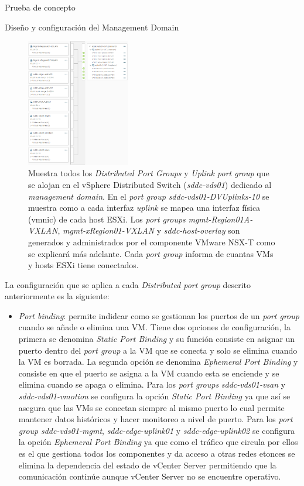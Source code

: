 \begin{section}{Prueba de concepto}
\begin{subsection}{Diseño y configuración del Management Domain}
\begin{itemize}
    \end{itemize}
    \begin{figure}[h]
      \centering
      \includegraphics[width=0.4\textwidth]{imaxes/pruebaconcepto/distributedSwitchEntornoFinal.png}
      \caption{Muestra todos los \textit{Distributed Port Groups} y \textit{Uplink port group} que se alojan en el vSphere Distributed Switch (\textit{sddc-vds01}) dedicado al \textit{management domain}. En el \textit{port group} \textit{sddc-vds01-DVUplinks-10} se muestra como a cada interfaz \textit{uplink} se mapea una interfaz física (vmnic) de cada host ESXi. Los \textit{port groups} \textit{mgmt-Region01A-VXLAN}, \textit{mgmt-xRegion01-VXLAN} y \textit{sddc-host-overlay} son generados y administrados por el componente VMware NSX-T como se explicará más adelante. Cada \textit{port group} informa de cuantas VMs y hosts ESXi tiene conectados.}
      \label{fig:port-groups-vSwitch-vSphere}
    \end{figure}
    \FloatBarrier
    La configuración que se aplica a cada \textit{Distributed port group} descrito anteriormente es la siguiente:
    \begin{itemize}
      \item \textit{Port binding}: permite indidcar como se gestionan los puertos de un \textit{port group} cuando se añade o elimina una VM. Tiene dos opciones de configuración, la primera se denomina \textit{Static Port Binding} y su función consiste en asignar un puerto dentro del \textit{port group} a la VM que se conecta y solo se elimina cuando la VM es borrada. La segunda opción se denomina \textit{Ephemeral Port Binding} y consiste en que el puerto se asigna a la VM cuando esta se enciende y se elimina cuando se apaga o elimina. Para los \textit{port groups} \textit{sddc-vds01-vsan} y \textit{sddc-vds01-vmotion} se configura la opción \textit{Static Port Binding} ya que así se asegura que las VMs se conectan siempre al mismo puerto lo cual permite mantener datos históricos y hacer monitoreo a nivel de puerto. Para los \textit{port group} \textit{sddc-vds01-mgmt}, \textit{sddc-edge-uplink01} y \textit{sddc-edge-uplink02} se configura la opción \textit{Ephemeral Port Binding} ya que como el tráfico que circula por ellos es el que gestiona todos los componentes y da acceso a otras redes etonces se elimina la dependencia del estado de vCenter Server permitiendo que la comunicación continúe aunque vCenter Server no se encuentre operativo.
    

\end{itemize}
\end{subsection}
\end{section}
